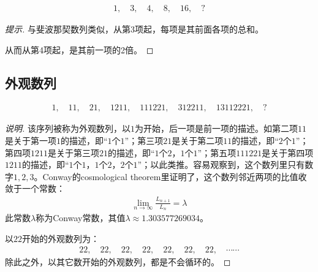 \begin{example}
  \begin{align*}
    1,\quad 3,\quad 4,\quad 8,\quad 16,\quad ?
  \end{align*}
\end{example}
\begin{proof}[提示]与斐波那契数列类似，从第3项起，每项是其前面各项的总和。
  \begin{center}
  \end{center}
  从而从第4项起，是其前一项的2倍。
\end{proof}


\subsection{外观数列}
\label{sec:look-and-say-sequence}

\begin{example}
  \begin{align*}
    1,\quad 11,\quad 21,\quad 1211,\quad 111221,\quad 312211,\quad 13112221,\quad ?
  \end{align*}
\end{example}
\begin{proof}[说明]
  该序列被称为外观数列，以$1$为开始，后一项是前一项的描述。如第二项$11$是关于第一项$1$的描述，即“$1$个$1$”；第三项$21$是关于第二项$11$的描述，即“$2$个$1$”；第四项$1211$是关于第三项$21$的描述，即“$1$个$2$，$1$个$1$”；第五项$111221$是关于第四项$1211$的描述，即“$1$个$1$，$1$个$2$，$2$个$1$”；以此类推。容易观察到，这个数列里只有数字$1,2,3$。Conway的cosmological theorem里证明了，这个数列邻近两项的比值收敛于一个常数：
  \begin{align*}
    \lim_{n\to\infty}\frac{L_{n+1}}{L_n}=\lambda
  \end{align*}
  此常数$\lambda$称为Conway常数，其值$\lambda\approx 1.303577269034$。

  以$22$开始的外观数列为：
  \begin{align*}
    22,\quad 22,\quad 22,\quad 22,\quad 22,\quad 22,\quad 22,\quad \cdots\cdots
  \end{align*}
  除此之外，以其它数开始的外观数列，都是不会循环的。
\end{proof}

